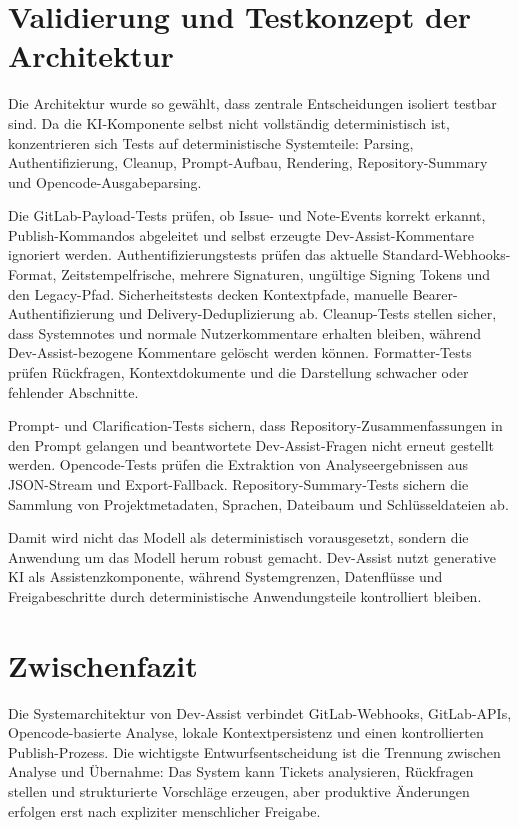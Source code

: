 \documentclass[12pt,a4paper,oneside]{scrreprt}
\begin{document}
\section{Validierung und Testkonzept der Architektur}

Die Architektur wurde so gewählt, dass zentrale Entscheidungen isoliert testbar sind. Da die KI-Komponente selbst nicht vollständig deterministisch ist, konzentrieren sich Tests auf deterministische Systemteile: Parsing, Authentifizierung, Cleanup, Prompt-Aufbau, Rendering, Repository-Summary und Opencode-Ausgabeparsing.

Die GitLab-Payload-Tests prüfen, ob Issue- und Note-Events korrekt erkannt, Publish-Kommandos abgeleitet und selbst erzeugte Dev-Assist-Kommentare ignoriert werden. Authentifizierungstests prüfen das aktuelle Standard-Webhooks-Format, Zeitstempelfrische, mehrere Signaturen, ungültige Signing Tokens und den Legacy-Pfad. Sicherheitstests decken Kontextpfade, manuelle Bearer-Authentifizierung und Delivery-Deduplizierung ab. Cleanup-Tests stellen sicher, dass Systemnotes und normale Nutzerkommentare erhalten bleiben, während Dev-Assist-bezogene Kommentare gelöscht werden können. Formatter-Tests prüfen Rückfragen, Kontextdokumente und die Darstellung schwacher oder fehlender Abschnitte.

Prompt- und Clarification-Tests sichern, dass Repository-Zusammenfassungen in den Prompt gelangen und beantwortete Dev-Assist-Fragen nicht erneut gestellt werden. Opencode-Tests prüfen die Extraktion von Analyseergebnissen aus JSON-Stream und Export-Fallback. Repository-Summary-Tests sichern die Sammlung von Projektmetadaten, Sprachen, Dateibaum und Schlüsseldateien ab.

Damit wird nicht das Modell als deterministisch vorausgesetzt, sondern die Anwendung um das Modell herum robust gemacht. Dev-Assist nutzt generative KI als Assistenzkomponente, während Systemgrenzen, Datenflüsse und Freigabeschritte durch deterministische Anwendungsteile kontrolliert bleiben.

\section{Zwischenfazit}

Die Systemarchitektur von Dev-Assist verbindet GitLab-Webhooks, GitLab-APIs, Opencode-basierte Analyse, lokale Kontextpersistenz und einen kontrollierten Publish-Prozess. Die wichtigste Entwurfsentscheidung ist die Trennung zwischen Analyse und Übernahme: Das System kann Tickets analysieren, Rückfragen stellen und strukturierte Vorschläge erzeugen, aber produktive Änderungen erfolgen erst nach expliziter menschlicher Freigabe.
\end{document}
